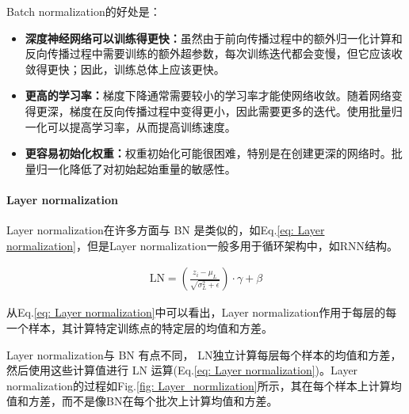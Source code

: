 \documentclass[letterpaper,10pt]{article}
\begin{document}
	Batch normalization的好处是：
	
	\begin{itemize}
		\item {}
		
		\textbf{深度神经网络可以训练得更快：}虽然由于前向传播过程中的额外归一化计算和反向传播过程中需要训练的额外超参数，每次训练迭代都会变慢，但它应该收敛得更快；因此，训练总体上应该更快。	
		
		\item {}
		\textbf{更高的学习率：}梯度下降通常需要较小的学习率才能使网络收敛。随着网络变得更深，梯度在反向传播过程中变得更小，因此需要更多的迭代。使用批量归一化可以提高学习率，从而提高训练速度。
		
		\item {}
		\textbf{更容易初始化权重：}权重初始化可能很困难，特别是在创建更深的网络时。批量归一化降低了对初始起始重量的敏感性。
		
	\end{itemize}
	
	\paragraph{Layer normalization}
	
	Layer normalization在许多方面与 BN 是类似的，如Eq.\ref{eq: Layer normalization}，但是Layer normalization一般多用于循环架构中，如RNN结构。
	
	\begin{equation}
		\begin{aligned}
			\text{LN} = \left(\frac{z_i-\mu_L}{\sqrt{\sigma_L^2 + \epsilon}}\right) \cdot \gamma + \beta 
		\end{aligned}
		\label{eq: Layer normalization}
	\end{equation}
	
	从Eq.\ref{eq: Layer normalization}中可以看出，Layer normalization作用于每层的每一个样本，其计算特定训练点的特定层的均值和方差。
	
	Layer normalization与 BN 有点不同， LN独立计算每层每个样本的均值和方差，然后使用这些计算值进行 LN 运算(Eq.\ref{eq: Layer normalization})。Layer normalization的过程如Fig.\ref{fig: Layer_normlization}所示，其在每个样本上计算均值和方差，而不是像BN在每个批次上计算均值和方差。
	
\end{document}
